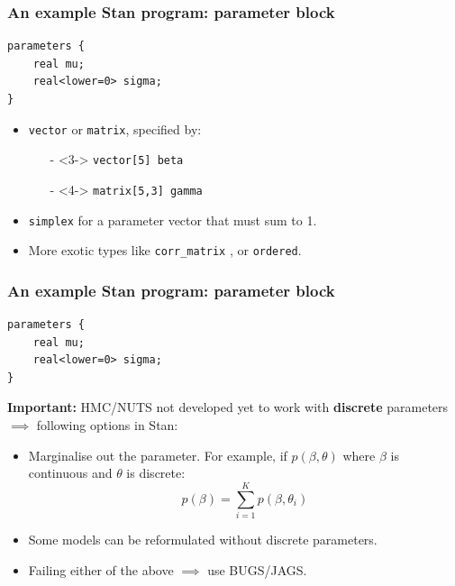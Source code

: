 \documentclass[handout]{beamer}
\begin{document}
\begin{frame}[fragile]
\frametitle{An example Stan program: parameter block}
\begin{verbatim}
parameters {
    real mu;
    real<lower=0> sigma;
}
\end{verbatim}
\begin{itemize}
\item<2-> \texttt{vector} or \texttt{matrix}, specified by:
\begin{itemize}
	\item[-]<3-> \texttt{vector[5] beta}
	\item[-]<4-> \texttt{matrix[5,3] gamma}
\end{itemize}
\item<5-> \texttt{simplex} for a parameter vector that must sum to 1.
\item<6-> More exotic types like \texttt{corr_matrix} , or \texttt{ordered}.
\end{itemize}

\end{frame}

\begin{frame}[fragile]
\frametitle{An example Stan program: parameter block}
\begin{verbatim}
parameters {
    real mu;
    real<lower=0> sigma;
}
\end{verbatim}
\textbf{Important:} HMC/NUTS not developed yet to work with \textbf{discrete} parameters $\implies$ following options in Stan:

\begin{itemize}
\item<3-> Marginalise out the parameter. For example, if $p(\beta,\theta)$ where $\beta$ is continuous and $\theta$ is discrete:
\begin{equation}
p(\beta) = \sum\limits_{i=1}^{K} p(\beta,\theta_i)
\end{equation}
\item<5-> Some models can be reformulated without discrete parameters.
\item<6-> Failing either of the above $\implies$ use BUGS/JAGS.
\end{itemize}

\end{frame}
\end{document}
